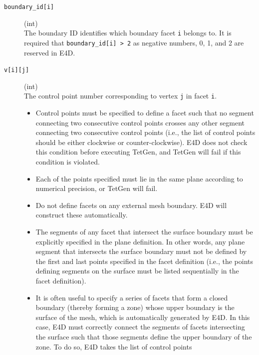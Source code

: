 \documentclass[a4paper,12pt]{article}
\begin{document}
\begin{description}
    \item[\texttt{boundary\_id[i]}] (int)\hfill \\
          The boundary ID identifies which boundary facet \texttt{i} belongs to. It is required that \texttt{boundary\_id[i] > 2} as negative numbers, 0, 1, and 2 are reserved in E4D.

    \item[\texttt{v[i][j]}] (int)\hfill \\
          The control point number corresponding to vertex \texttt{j} in facet \texttt{i}.

          \begin{itemize}
              \item Control points must be specified to define a facet such that no segment
                    connecting two consecutive control points crosses any other segment connecting
                    two consecutive control points (i.e., the list of control points should be
                    either clockwise or counter-clockwise). E4D does not check this condition
                    before executing TetGen, and TetGen will fail if this condition is violated.
              \item Each of the points specified must lie in the same plane according to numerical
                    precision, or TetGen will fail.
              \item Do not define facets on any external mesh boundary. E4D will construct these
                    automatically.
              \item The segments of any facet that intersect the surface boundary must be
                    explicitly specified in the plane definition. In other words, any plane segment
                    that intersects the surface boundary must not be defined by the first and last
                    points specified in the facet definition (i.e., the points defining segments on
                    the surface must be listed sequentially in the facet definition).
              \item It is often useful to specify a series of facets that form a closed boundary
                    (thereby forming a zone) whose upper boundary is the surface of the mesh, which
                    is automatically generated by E4D. In this case, E4D must correctly connect the
                    segments of facets intersecting the surface such that those segments define the
                    upper boundary of the zone. To do so, E4D takes the list of control points

\end{itemize}
\end{description}
\end{document}
